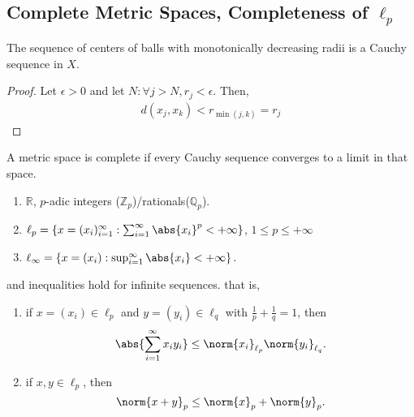 \subsection{Complete Metric Spaces, Completeness of \texorpdfstring{$\ell_p$}{little lp}}
\begin{theorem}
    The sequence of centers of balls with monotonically decreasing radii is a Cauchy sequence in $X$.
\end{theorem}

\begin{proof}
    Let $\epsilon > 0$ and let $N : \forall j > N, r_j < \epsilon$. Then, 
    \begin{align*}
        d(x_j, x_k) < r_{\min(j, k)} = r_j
    \end{align*}
\end{proof}

\begin{definition}
    A metric space is complete if every Cauchy sequence converges to a limit in that space.
\end{definition}

\begin{example}
    \begin{enumerate}
        \item $\mathbb{R}$, $p$-adic integers ($\mathbb{Z}_p$)/rationals($\mathbb{Q}_p$).
        \item $\ell_p = \{x = (x_i)_{i=1}^\infty : \sum_{i = 1}^\infty \abs{x_i}^p < + \infty\}$, $1 \leq p \leq + \infty$
        \item $\ell_\infty = \{x = (x_i) : \sup_{i  =1}^\infty \abs{x_i} < + \infty\}$.
    \end{enumerate}
\end{example}

\begin{proposition}
     and  inequalities hold for infinite sequences. that is,
    \begin{enumerate}
        \item if $x=(x_i) \in \ell_p$ and $y=(y_i) \in \ell_q$ with $\frac{1}{p} + \frac{1}{q} = 1$, then \[
    \abs{\sum_{i=1}^\infty x_i y_i} \leq \norm{x_i}_{\ell_p}\norm{y_i}_{\ell_q}.
    \]
    \item if $x, y \in \ell_p$, then \[
        \norm{x + y}_p \leq \norm{x}_p + \norm{y}_p.    
    \]
    \end{enumerate}
\end{proposition}

